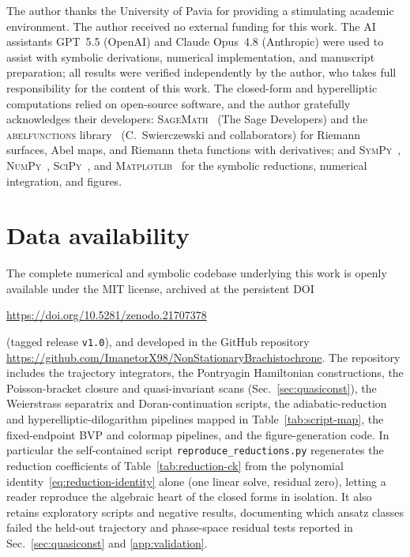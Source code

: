 \documentclass[12pt]{iopart}
\begin{document}
\ack
The author thanks the University of Pavia for providing a stimulating academic
environment. The author received no external funding for this work. The AI
assistants GPT~5.5 (OpenAI) and Claude Opus~4.8 (Anthropic) were used to assist with
symbolic derivations, numerical implementation, and manuscript preparation; all
results were verified independently by the author, who takes full responsibility
for the content of this work. The closed-form and hyperelliptic computations relied
on open-source software, and the author gratefully acknowledges their developers:
\textsc{SageMath}~\cite{SageMath} (The Sage Developers) and the
\textsc{abelfunctions} library~\cite{abelfunctions} (C.~Swierczewski and
collaborators) for Riemann surfaces, Abel maps, and Riemann theta functions with
derivatives; and \textsc{SymPy}~\cite{SymPy}, \textsc{NumPy}~\cite{NumPy},
\textsc{SciPy}~\cite{SciPy}, and \textsc{Matplotlib}~\cite{Matplotlib} for the
symbolic reductions, numerical integration, and figures.

\section*{Data availability}
The complete numerical and symbolic codebase underlying this work is openly
available under the MIT license, archived at the persistent
DOI~\cite{Rosignoli2026Code}
\begin{center}
\url{https://doi.org/10.5281/zenodo.21707378}
\end{center}
(tagged release \texttt{v1.0}), and developed in the GitHub repository
\url{https://github.com/ImanetorX98/NonStationaryBrachistochrone}.
The repository includes the trajectory integrators, the Pontryagin Hamiltonian
constructions, the Poisson-bracket closure and quasi-invariant scans
(Sec.~\ref{sec:quasiconst}), the Weierstrass separatrix and Doran-continuation
scripts, the adiabatic-reduction and hyperelliptic-dilogarithm pipelines mapped in
Table~\ref{tab:script-map}, the fixed-endpoint BVP and colormap pipelines, and the
figure-generation code. In particular the self-contained script
\texttt{reproduce\_reductions.py} regenerates the reduction coefficients of
Table~\ref{tab:reduction-ck} from the polynomial
identity~\eqref{eq:reduction-identity} alone (one linear solve, residual zero),
letting a reader reproduce the algebraic heart of the closed forms in isolation. It
also retains exploratory scripts and negative results,
documenting which ansatz classes failed the held-out trajectory and phase-space
residual tests reported in Sec.~\ref{sec:quasiconst} and
\ref{app:validation}.
\end{document}
